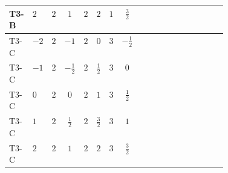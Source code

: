 \documentclass[8pt]{article}
\begin{document}
\begin{landscape}
\begin{longtable}{@{}llcccccc >{\raggedright\arraybackslash}p{0.21\linewidth} >{\raggedright\arraybackslash}p{0.21\linewidth}@{}}
\midrule
T3-B & $2$ & $2$ & $1$ & $2$ & $2$ & $1$ & $\frac{3}{2}$ & \scriptsize\adjustbox{max width=\linewidth}{$\begin{gathered} 6 C_{5} Y_d Y_d^\dagger\end{gathered}$} & \scriptsize\adjustbox{max width=\linewidth}{$\begin{gathered} 6 C_{5} Y_u Y_u^\dagger\end{gathered}$} \\
\midrule
T3-C & $-2$ & $2$ & $-1$ & $2$ & $0$ & $3$ & $-\frac{1}{2}$ & \scriptsize\adjustbox{max width=\linewidth}{$\begin{gathered} 6 C_{5} Y_d Y_d^\dagger\end{gathered}$} & \scriptsize\adjustbox{max width=\linewidth}{$\begin{gathered} 6 C_{5} Y_u Y_u^\dagger\end{gathered}$} \\
\midrule
T3-C & $-1$ & $2$ & $-\frac{1}{2}$ & $2$ & $\frac{1}{2}$ & $3$ & $0$ & \scriptsize\adjustbox{max width=\linewidth}{$\begin{gathered} 6 C_{5} Y_d Y_d^\dagger\end{gathered}$} & \scriptsize\adjustbox{max width=\linewidth}{$\begin{gathered} 6 C_{5} Y_u Y_u^\dagger\end{gathered}$} \\
\midrule
T3-C & $0$ & $2$ & $0$ & $2$ & $1$ & $3$ & $\frac{1}{2}$ & \scriptsize\adjustbox{max width=\linewidth}{$\begin{gathered} 6 C_{5} Y_d Y_d^\dagger\end{gathered}$} & \scriptsize\adjustbox{max width=\linewidth}{$\begin{gathered} 6 C_{5} Y_u Y_u^\dagger\end{gathered}$} \\
\midrule
T3-C & $1$ & $2$ & $\frac{1}{2}$ & $2$ & $\frac{3}{2}$ & $3$ & $1$ & \scriptsize\adjustbox{max width=\linewidth}{$\begin{gathered} 6 C_{5} Y_d Y_d^\dagger\end{gathered}$} & \scriptsize\adjustbox{max width=\linewidth}{$\begin{gathered} 6 C_{5} Y_u Y_u^\dagger\end{gathered}$} \\
\midrule
T3-C & $2$ & $2$ & $1$ & $2$ & $2$ & $3$ & $\frac{3}{2}$ & \scriptsize\adjustbox{max width=\linewidth}{$\begin{gathered} 6 C_{5} Y_d Y_d^\dagger\end{gathered}$} & \scriptsize\adjustbox{max width=\linewidth}{$\begin{gathered} 6 C_{5} Y_u Y_u^\dagger\end{gathered}$} \\

\end{longtable}
\end{landscape}
\end{document}
